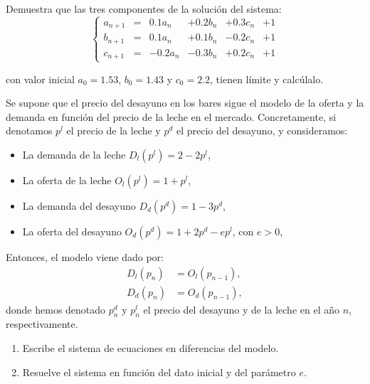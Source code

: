 \begin{ejercicio}
Demuestra que las tres componentes de la solución del sistema:
\begin{equation*}
\left\{
    \begin{array}{rcrrrrr}
        a_{n+1} &=&  0.1a_n &+ 0.2b_n &+ 0.3c_n &+ 1\\
        b_{n+1} &=&  0.1a_n &+ 0.1b_n &- 0.2c_n &+ 1\\
        c_{n+1} &=& -0.2a_n &- 0.3b_n &+ 0.2c_n &+ 1
    \end{array}
\right.
\end{equation*}

con valor inicial $a_0 = 1.53$, $b_0 = 1.43$ y $c_0 = 2.2$, tienen límite y calcúlalo.
\end{ejercicio}


\begin{ejercicio}
Se supone que el precio del desayuno en los bares sigue el modelo de la oferta y la demanda en función del precio de la leche en el mercado. Concretamente, si denotamos $p^l$ el precio de la leche y $p^d$ el precio del desayuno, y consideramos:
\begin{itemize}
    \item La demanda de la leche $D_l(p^l) = 2 - 2p^l$,
    \item La oferta de la leche $O_l(p^l) = 1 + p^l$,
    \item La demanda del desayuno $D_d(p^d) = 1 - 3p^d$,
    \item La oferta del desayuno $O_d(p^d) = 1 + 2p^d - ep^l$, con $e > 0$,
\end{itemize}

Entonces, el modelo viene dado por:
\begin{align*}
D_l(p_n) &= O_l(p_{n-1}),\\
D_d(p_n) &= O_d(p_{n-1}),
\end{align*}
donde hemos denotado $p^d_n$ y $p^l_n$ el precio del desayuno y de la leche en el año $n$, respectivamente.
\begin{enumerate}
    \item Escribe el sistema de ecuaciones en diferencias del modelo.
    \item Resuelve el sistema en función del dato inicial y del parámetro $e$.
\end{enumerate}
\end{ejercicio}

